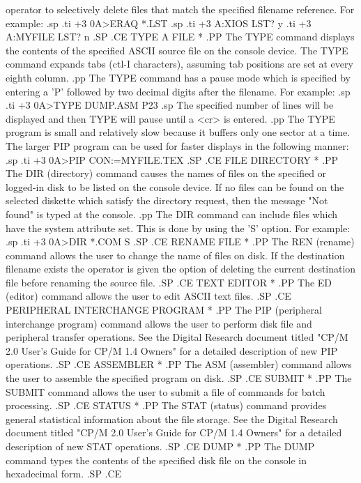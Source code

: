 operator  to  selectively  delete  files  that  match   the
specified filename reference.  For example:
.sp
.ti +3
0A>ERAQ *.LST
.sp
.ti +3
A:XIOS    LST? y
.ti +3
A:MYFILE  LST? n
.SP
.CE
TYPE A FILE *
.PP
The TYPE command displays the contents of the specified ASCII source
file on the console device.  The TYPE command expands tabs (ctl-I
characters), assuming tab positions are set at every eighth column.
.pp
The  TYPE  command has a pause mode which is  specified  by
entering  a  'P' followed by two decimal digits  after  the
filename. For example:
.sp
.ti +3
0A>TYPE DUMP.ASM P23
.sp
The  specified number of lines will be displayed  and  then
TYPE will pause until a <cr> is entered.
.pp
The  TYPE  program is small and relatively slow because  it
buffers only one sector at a time.   The larger PIP program
can be used for faster displays in the following manner:
.sp
.ti +3
0A>PIP CON:=MYFILE.TEX
.SP
.CE
FILE DIRECTORY *
.PP
The DIR (directory) command causes the names of files on the specified or logged-in
disk to be listed on the console device.  If no files can be found
on the selected diskette which satisfy the directory request, then
the message "Not found" is typed at the console.
.pp
The  DIR  command can include files which have  the  system
attribute set.   This is done by using the 'S' option.  For
example:
.sp
.ti +3
0A>DIR *.COM S
.SP
.CE
RENAME FILE *
.PP
The REN (rename) command allows the user to change the name of files
on disk.
If  the  destination filename exists the operator is  given
the option of deleting the current destination file  before
renaming the source file.
.SP
.CE
TEXT EDITOR *
.PP
The ED (editor) command allows the user to edit ASCII text files.
.SP
.CE
PERIPHERAL INTERCHANGE PROGRAM *
.PP
The PIP (peripheral interchange program) command allows the user to
perform disk file and peripheral transfer operations.
See the Digital Research document titled "CP/M 2.0 User's Guide for
CP/M 1.4 Owners" for a detailed description of new PIP operations.
.SP
.CE
ASSEMBLER *
.PP
The ASM (assembler) command allows the user to assemble the specified
program on disk.
.SP
.CE
SUBMIT *
.PP
The SUBMIT command allows the user to submit a file of commands for
batch processing.
.SP
.CE
STATUS *
.PP
The STAT (status) command provides general statistical information
about the file storage.
See the Digital Research document titled "CP/M 2.0 User's Guide for
CP/M 1.4 Owners" for a detailed description of new STAT operations.
.SP
.CE
DUMP *
.PP
The DUMP command types the contents of the specified disk file on the
console in hexadecimal form.
.SP
.CE
